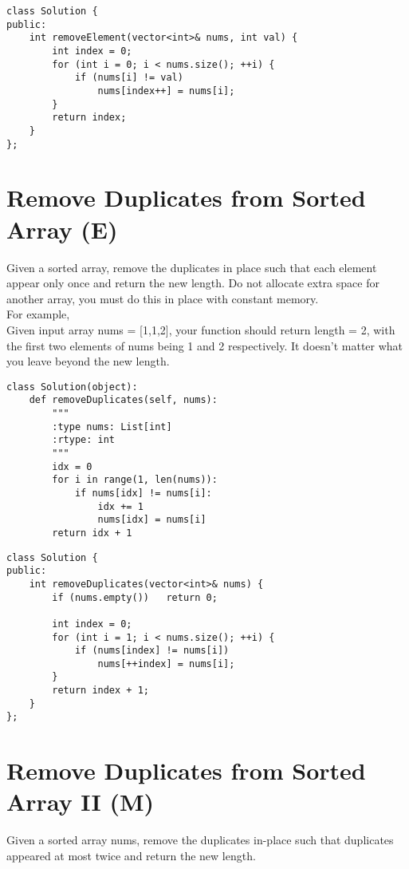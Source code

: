 \begin{lstlisting}
class Solution {
public:
    int removeElement(vector<int>& nums, int val) {
        int index = 0;
        for (int i = 0; i < nums.size(); ++i) {
            if (nums[i] != val)
                nums[index++] = nums[i];
        }
        return index;
    }
};
\end{lstlisting}


\section{Remove Duplicates from Sorted Array (E)}
Given a sorted array, remove the duplicates in place such that each element appear only once and return the new length. Do not allocate extra space for another array, you must do this in place with constant memory.\\

For example,\\
Given input array nums = [1,1,2], your function should return length = 2, with the first two elements of nums being 1 and 2 respectively. It doesn't matter what you leave beyond the new length. \\
    
\begin{lstlisting}
class Solution(object):
    def removeDuplicates(self, nums):
        """
        :type nums: List[int]
        :rtype: int
        """
        idx = 0
        for i in range(1, len(nums)):
            if nums[idx] != nums[i]:
                idx += 1
                nums[idx] = nums[i]
        return idx + 1       
\end{lstlisting}
        
\begin{lstlisting}
class Solution {
public:
    int removeDuplicates(vector<int>& nums) {
        if (nums.empty())   return 0;
            
        int index = 0;
        for (int i = 1; i < nums.size(); ++i) {
            if (nums[index] != nums[i])
                nums[++index] = nums[i];
        }
        return index + 1;
    }
};
\end{lstlisting}

\section{Remove Duplicates from Sorted Array II (M)}
Given a sorted array nums, remove the duplicates in-place such that duplicates appeared at most twice and return the new length.\\

